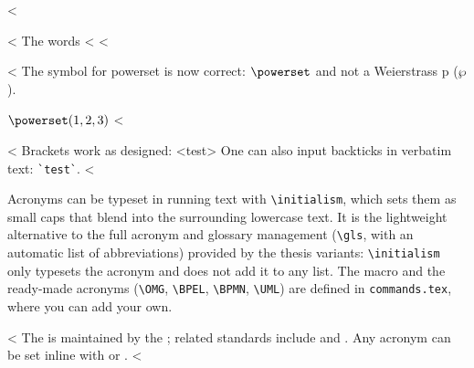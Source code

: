 <%

<%
The words <%
<%

<%
The symbol for powerset is now correct: $\powerset$ and not a Weierstrass p ($\wp$).

$\powerset({1,2,3})$
<%

<%
Brackets work as designed:
<test>
One can also input backticks in verbatim text: \verb|`test`|.
<%

Acronyms can be typeset in running text with \verb+\initialism+, which sets them as small caps that blend into the surrounding lowercase text. It is the lightweight alternative to the full acronym and glossary management (\verb+\gls+, with an automatic list of abbreviations) provided by the thesis variants: \verb+\initialism+ only typesets the acronym and does not add it to any list. The macro and the ready-made acronyms (\verb+\OMG+, \verb+\BPEL+, \verb+\BPMN+, \verb+\UML+) are defined in \texttt{commands.tex}, where you can add your own.

<%
The \UML is maintained by the \OMG; related standards include \BPEL and \BPMN.
Any acronym can be set inline with  or .
<%
